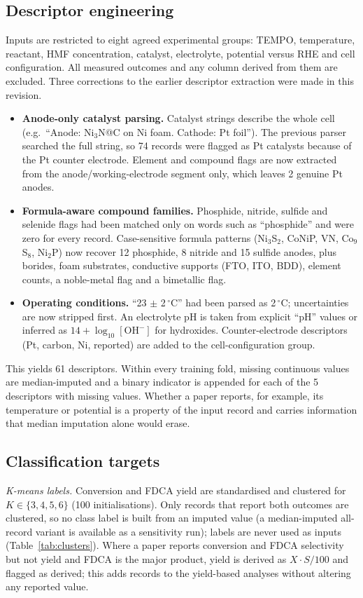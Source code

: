 \documentclass[11pt,a4paper]{article}
\begin{document}
\subsection{Descriptor engineering}
Inputs are restricted to eight agreed experimental groups: TEMPO, temperature, reactant,
HMF concentration, catalyst, electrolyte, potential versus RHE and cell configuration. All
measured outcomes and any column derived from them are excluded. Three corrections to the
earlier descriptor extraction were made in this revision.
\begin{itemize}
\item \textbf{Anode-only catalyst parsing.} Catalyst strings describe the whole cell
(e.g.\ ``Anode: Ni$_3$N@C on Ni foam. Cathode: Pt foil''). The previous parser searched the full
string, so 74 records were flagged as Pt catalysts because of the Pt counter electrode. Element
and compound flags are now extracted from the anode/working-electrode segment only, which leaves
2 genuine Pt anodes.
\item \textbf{Formula-aware compound families.} Phosphide, nitride, sulfide and selenide
flags had been matched only on words such as ``phosphide'' and were zero for every record.
Case-sensitive formula patterns (Ni$_3$S$_2$, CoNiP, VN, Co$_9$S$_8$, Ni$_2$P) now recover 12
phosphide, 8 nitride and 15 sulfide anodes, plus borides, foam substrates, conductive supports
(FTO, ITO, BDD), element counts, a noble-metal flag and a bimetallic flag.
\item \textbf{Operating conditions.} ``23 $\pm$ 2\,$^\circ$C'' had been parsed as 2\,$^\circ$C;
uncertainties are now stripped first. An electrolyte pH is taken from explicit ``pH'' values or
inferred as $14+\log_{10}[\mathrm{OH^-}]$ for hydroxides. Counter-electrode descriptors
(Pt, carbon, Ni, reported) are added to the cell-configuration group.
\end{itemize}
This yields 61 descriptors. Within every training fold, missing continuous values are median-imputed and a binary indicator is appended for each of the 5 descriptors with missing values. Whether a paper reports, for example, its temperature or potential is a property of the input record and carries information that median imputation alone would erase.
\subsection{Classification targets}
\textit{K-means labels.} Conversion and FDCA yield are standardised and clustered for
$K\in\{3,4,5,6\}$ (100 initialisations). Only records that report both outcomes are clustered, so
no class label is built from an imputed value (a median-imputed all-record variant is available as
a sensitivity run); labels are never used as inputs (Table~\ref{tab:clusters}). Where a paper
reports conversion and FDCA selectivity but not yield and FDCA is the major product, yield is
derived as $X\cdot S/100$ and flagged as derived; this adds records to the yield-based analyses
without altering any reported value.
\end{document}
